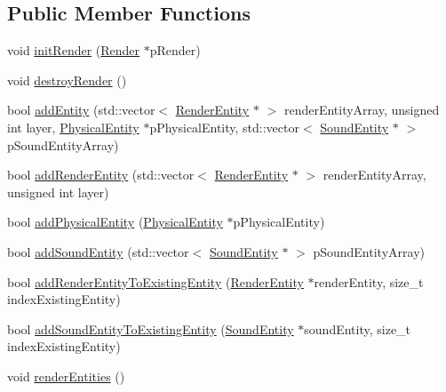 \subsection*{Public Member Functions}
\begin{DoxyCompactItemize}
\item 
void \hyperlink{class_symp_1_1_entity_manager_a73170f4bf6eb9fcf6519aef64c582f00}{init\-Render} (\hyperlink{class_symp_1_1_render}{Render} $\ast$p\-Render)
\item 
void \hyperlink{class_symp_1_1_entity_manager_ac5c8ac7c5e75bbfce6fc6fe227f2272e}{destroy\-Render} ()
\item 
bool \hyperlink{class_symp_1_1_entity_manager_aaacf8aa937946a64cf2edb6bb35e90d7}{add\-Entity} (std\-::vector$<$ \hyperlink{class_symp_1_1_render_entity}{Render\-Entity} $\ast$ $>$ render\-Entity\-Array, unsigned int layer, \hyperlink{class_symp_1_1_physical_entity}{Physical\-Entity} $\ast$p\-Physical\-Entity, std\-::vector$<$ \hyperlink{class_symp_1_1_sound_entity}{Sound\-Entity} $\ast$ $>$ p\-Sound\-Entity\-Array)
\item 
bool \hyperlink{class_symp_1_1_entity_manager_a462c7b9c4b1bb4bee60887f17ec151de}{add\-Render\-Entity} (std\-::vector$<$ \hyperlink{class_symp_1_1_render_entity}{Render\-Entity} $\ast$ $>$ render\-Entity\-Array, unsigned int layer)
\item 
bool \hyperlink{class_symp_1_1_entity_manager_a51bad2c8fb3f002ab9c30af538ede256}{add\-Physical\-Entity} (\hyperlink{class_symp_1_1_physical_entity}{Physical\-Entity} $\ast$p\-Physical\-Entity)
\item 
bool \hyperlink{class_symp_1_1_entity_manager_a56ad8bda1790f4fd70b1fef35fcb4cb8}{add\-Sound\-Entity} (std\-::vector$<$ \hyperlink{class_symp_1_1_sound_entity}{Sound\-Entity} $\ast$ $>$ p\-Sound\-Entity\-Array)
\item 
bool \hyperlink{class_symp_1_1_entity_manager_aaad8b492cd6742eb7764698d5293c5ee}{add\-Render\-Entity\-To\-Existing\-Entity} (\hyperlink{class_symp_1_1_render_entity}{Render\-Entity} $\ast$render\-Entity, size\-\_\-t index\-Existing\-Entity)
\item 
bool \hyperlink{class_symp_1_1_entity_manager_acec950a76e33763d3ed87b66546c3fbf}{add\-Sound\-Entity\-To\-Existing\-Entity} (\hyperlink{class_symp_1_1_sound_entity}{Sound\-Entity} $\ast$sound\-Entity, size\-\_\-t index\-Existing\-Entity)
\item 
void \hyperlink{class_symp_1_1_entity_manager_a19ec565ae603d54fa0492c426e48f7fd}{render\-Entities} ()
\item 

\end{DoxyCompactItemize}
